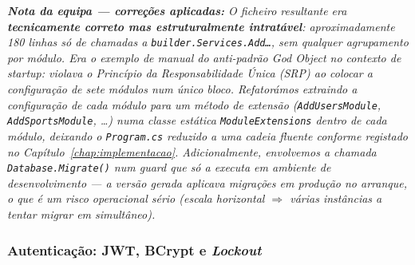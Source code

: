 \noindent\textit{\textbf{Nota da equipa --- correções aplicadas:} O ficheiro resultante era \textbf{tecnicamente correto mas estruturalmente intratável}: aproximadamente 180 linhas só de chamadas a \texttt{builder.Services.Add\ldots}, sem qualquer agrupamento por módulo. Era o exemplo de manual do anti-padrão \textit{God Object} no contexto de \textit{startup}: violava o Princípio da Responsabilidade Única (SRP) ao colocar a configuração de sete módulos num único bloco. Refatorámos extraindo a configuração de cada módulo para um método de extensão (\texttt{AddUsersModule}, \texttt{AddSportsModule}, \ldots) numa classe estática \texttt{ModuleExtensions} dentro de cada módulo, deixando o \texttt{Program.cs} reduzido a uma cadeia fluente conforme registado no Capítulo~\ref{chap:implementacao}. Adicionalmente, envolvemos a chamada \texttt{Database.Migrate()} num \textit{guard} que só a executa em ambiente de desenvolvimento --- a versão gerada aplicava migrações em produção no arranque, o que é um risco operacional sério (escala horizontal $\Rightarrow$ várias instâncias a tentar migrar em simultâneo).}

\subsubsection*{Autenticação: JWT, BCrypt e \textit{Lockout}}


